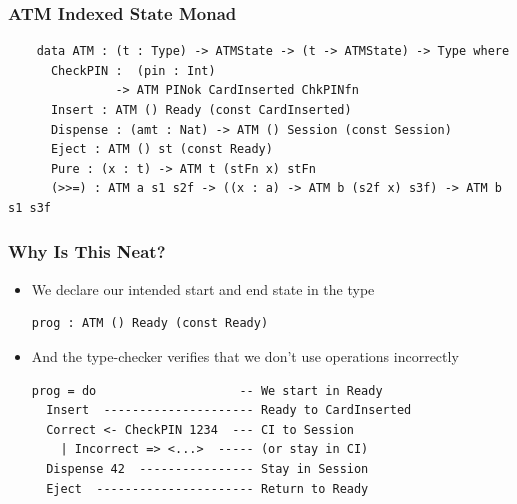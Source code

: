\documentclass[compress,handout]{beamer}
\begin{document}
\begin{frame}[fragile]
  \frametitle{ATM Indexed State Monad}

  \begin{verbatim}
    data ATM : (t : Type) -> ATMState -> (t -> ATMState) -> Type where
      CheckPIN :  (pin : Int)
               -> ATM PINok CardInserted ChkPINfn
      Insert : ATM () Ready (const CardInserted)
      Dispense : (amt : Nat) -> ATM () Session (const Session)
      Eject : ATM () st (const Ready)
      Pure : (x : t) -> ATM t (stFn x) stFn
      (>>=) : ATM a s1 s2f -> ((x : a) -> ATM b (s2f x) s3f) -> ATM b s1 s3f
  \end{verbatim}
\end{frame}


\begin{frame}[fragile]
  \frametitle{Why Is This Neat?}

  \begin{itemize}
    \item<1-> We declare our intended start and end state in the type
              \begin{verbatim}
prog : ATM () Ready (const Ready)
              \end{verbatim}
    \item<2-> And the type-checker verifies that we don't use operations
              incorrectly
              \begin{verbatim}
prog = do                    -- We start in Ready
  Insert  --------------------- Ready to CardInserted
  Correct <- CheckPIN 1234  --- CI to Session
    | Incorrect => <...>  ----- (or stay in CI)
  Dispense 42  ---------------- Stay in Session
  Eject  ---------------------- Return to Ready
              \end{verbatim}
  \end{itemize}

\end{frame}
\end{document}
